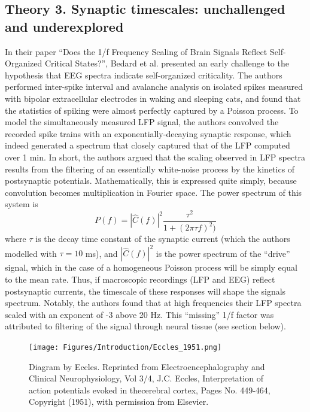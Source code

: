 \subsection{Theory 3. Synaptic timescales: unchallenged and underexplored} \label{sec:timescales}
In their paper ``Does the 1/f Frequency Scaling of Brain Signals Reflect Self-Organized Critical States?'', Bedard et al.\cite{Bedard2006} presented an early challenge to the hypothesis that EEG spectra indicate self-organized criticality. The authors performed inter-spike interval and avalanche analysis on isolated spikes measured with bipolar extracellular electrodes in waking and sleeping cats, and found that the statistics of spiking were almost perfectly captured by a Poisson process. To model the simultaneously measured LFP signal, the authors convolved the recorded spike trains with an exponentially-decaying synaptic response, which indeed generated a spectrum that closely captured that of the LFP computed over 1 min. In short, the authors argued that the scaling observed in LFP spectra results from the filtering of an essentially white-noise process by the kinetics of postsynaptic potentials. Mathematically, this is expressed quite simply, because convolution becomes multiplication in Fourier space. The power spectrum of this system is
\begin{equation}
P(f) =|\hat{C}(f)|^2 \frac{\tau^2} { 1+ (2\pi\tau f)^2)}
\end{equation}
where $\tau$ is the decay time constant of the synaptic current (which the authors modelled with $\tau=10$ \unit{\milli\second}), and $|\hat{C}(f)|^2$ is the power spectrum of the ``drive'' signal, which in the case of a homogeneous Poisson process will be simply equal to the mean rate. Thus, if macroscopic recordings (LFP and EEG) reflect postsynaptic currents, the timescale of these responses will shape the signals spectrum. Notably, the authors found that at high frequencies their LFP spectra scaled with an exponent of -3 above 20 Hz. This ``missing'' 1/f factor was attributed to filtering of the signal through neural tissue (see section below).

\begin{figure}
  \begin{minipage}[c]{90mm}
    \texttt{[image: Figures/Introduction/Eccles\_1951.png]}
  \end{minipage}\hfill
  \begin{minipage}[c]{75mm}
    \caption{ 
    Diagram by Eccles. 
    Reprinted from Electroencephalography and Clinical Neurophysiology, Vol 3/4, J.C. Eccles, Interpretation of action potentials evoked in thecerebral cortex, Pages No. 449-464, Copyright (1951), with permission from Elsevier.
    \vfill
    } \label{fig:figure2.2}
    
  \end{minipage}
\end{figure}

